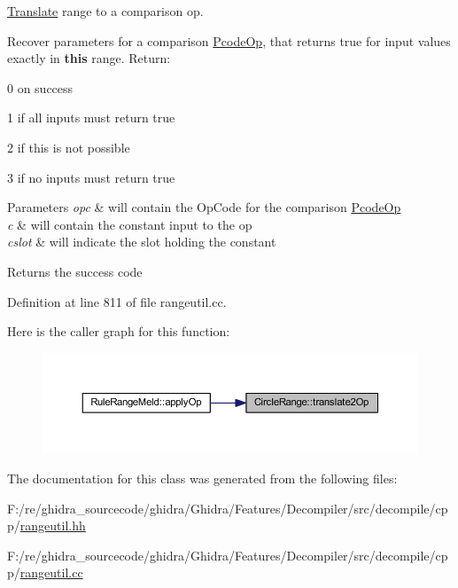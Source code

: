 \mbox{\hyperlink{class_translate}{Translate}} range to a comparison op. 

Recover parameters for a comparison \mbox{\hyperlink{class_pcode_op}{Pcode\+Op}}, that returns true for input values exactly in {\bfseries{this}} range. Return\+:
\begin{DoxyItemize}
\item 0 on success
\item 1 if all inputs must return true
\item 2 if this is not possible
\item 3 if no inputs must return true 
\begin{DoxyParams}{Parameters}
{\em opc} & will contain the Op\+Code for the comparison \mbox{\hyperlink{class_pcode_op}{Pcode\+Op}} \\
\hline
{\em c} & will contain the constant input to the op \\
\hline
{\em cslot} & will indicate the slot holding the constant \\
\hline
\end{DoxyParams}
\begin{DoxyReturn}{Returns}
the success code 
\end{DoxyReturn}

\end{DoxyItemize}

Definition at line 811 of file rangeutil.\+cc.

Here is the caller graph for this function\+:
\nopagebreak
\begin{figure}[H]
\begin{center}
\leavevmode
\includegraphics[width=350pt]{class_circle_range_abcf8280b8e4527ec260c396b6590fdae_icgraph}
\end{center}
\end{figure}


The documentation for this class was generated from the following files\+:\begin{DoxyCompactItemize}
\item 
F\+:/re/ghidra\+\_\+sourcecode/ghidra/\+Ghidra/\+Features/\+Decompiler/src/decompile/cpp/\mbox{\hyperlink{rangeutil_8hh}{rangeutil.\+hh}}\item 
F\+:/re/ghidra\+\_\+sourcecode/ghidra/\+Ghidra/\+Features/\+Decompiler/src/decompile/cpp/\mbox{\hyperlink{rangeutil_8cc}{rangeutil.\+cc}}\end{DoxyCompactItemize}
